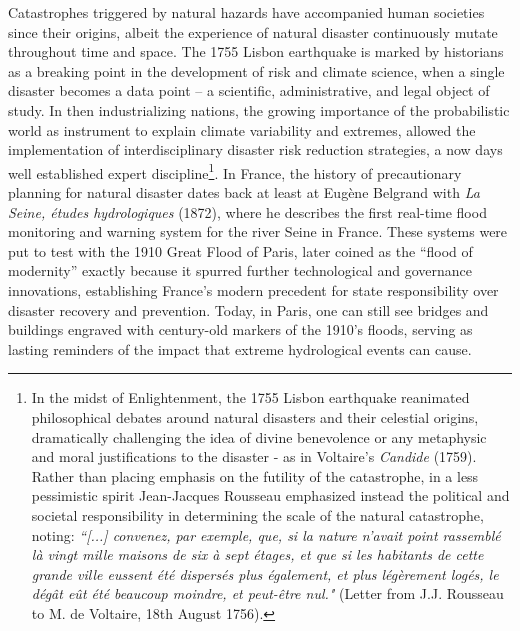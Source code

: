 \noindent
Catastrophes triggered by natural hazards have accompanied human societies since their origins, albeit the experience of natural disaster continuously mutate throughout time and space. The 1755 Lisbon earthquake is marked by historians as a breaking point in the development of risk and climate science, when a single disaster becomes a data point -- a scientific, administrative, and legal object of study. In then industrializing nations, the growing importance of the probabilistic world as instrument to explain climate variability and extremes, allowed the implementation of interdisciplinary disaster risk reduction strategies, a now days well established expert discipline\footnote{In the midst of Enlightenment, the 1755 Lisbon earthquake reanimated philosophical debates around natural disasters and their celestial origins, dramatically challenging the idea of divine benevolence or any metaphysic and moral justifications to the disaster - as in Voltaire's \textit{Candide} (1759). Rather than placing emphasis on the futility of the catastrophe, in a less pessimistic spirit Jean-Jacques Rousseau emphasized instead the political and societal responsibility in determining the scale of the natural catastrophe, noting: \textit{``[...] convenez, par exemple, que, si la nature n'avait point rassemblé là vingt mille maisons de six à sept étages, et que si les habitants de cette grande ville eussent été dispersés plus également, et plus légèrement logés, le dégât eût été beaucoup moindre, et peut-être nul."} (Letter from J.J. Rousseau to M. de Voltaire, 18th August 1756).}. In France, the history of precautionary planning for natural disaster dates back at least at Eugène Belgrand with \textit{La Seine, études hydrologiques} (1872), where he describes the first real-time flood monitoring and warning system for the river Seine in France. These systems were put to test with the 1910 Great Flood of Paris, later coined as the ``flood of modernity” exactly because it spurred further technological and governance innovations, establishing France's modern precedent for state responsibility over disaster recovery and prevention. Today, in Paris, one can still see bridges and buildings engraved with century-old markers of the 1910's floods, serving as lasting reminders of the impact that extreme hydrological events can cause.

